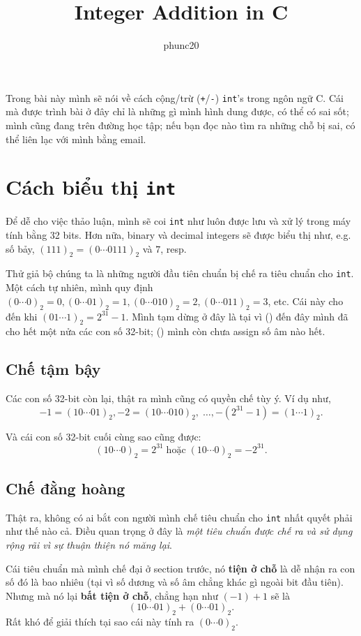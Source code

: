 \documentclass{article}
\author{phunc20}
\title{Integer Addition in C}
\begin{document}
\maketitle
Trong bài này mình sẽ nói về cách cộng/trừ (\texttt{+}/\texttt{-}) \texttt{int}'s trong ngôn ngữ C. Cái mà được trình bài ở đây chỉ là những gì mình hình dung được, có thể có sai sốt; mình cũng đang trên đường học tập; nếu bạn đọc nào tìm ra những chỗ bị sai, có thể liên lạc với mình bằng email.

\section{Cách biểu thị \texttt{int}}
Để dễ cho việc thảo luận, mình sẽ coi \texttt{int} như luôn được lưu và xử lý trong máy tính bằng 32 bits. Hơn nữa, binary và decimal integers sẽ được biểu thị như, e.g. số bảy, $(111)_{2} = (0\cdots0111)_{2}$ và $7$, resp.

Thử giả bộ chúng ta là những người đầu tiên chuẩn bị chế ra tiêu chuẩn cho \texttt{int}.
Một cách tự nhiên, mình quy định $(0\cdots0)_{2} = 0, (0\cdots01)_{2} = 1, (0\cdots010)_{2} = 2, (0\cdots011)_{2} = 3$, etc. Cái này cho đến khi $(01\cdots1)_{2} = 2^{31} - 1$. Mình tạm dừng ở đây là tại vì () đến đây mình đã cho hết một nửa các con số 32-bit; () mình còn chưa assign số âm nào hết.
\subsection{Chế tậm bậy}
Các con số 32-bit còn lại, thật ra mình cũng có quyền chế tùy ý. Ví dụ như, 
$$-1 = (10\cdots01)_{2}, -2 = (10\cdots010)_{2},\;\ldots, -(2^{31} - 1) = (1\cdots1)_{2}.$$

Và cái con số 32-bit cuối cùng sao cũng được:
$$(10\cdots0)_{2} = 2^{31} \;\textrm{hoặc}\; (10\cdots0)_{2} = -2^{31}.$$
\vfil \break

\subsection{Chế đằng hoàng}
Thật ra, không có ai bắt con người mình chế tiêu chuẩn cho \texttt{int} nhất quyết phải như thế nào cả. Điều quan trọng ở đây là \textit{một tiêu chuẩn được chế ra và sử dụng rộng rãi vì sự thuận thiện nó măng lại}.

Cái tiêu chuẩn mà mình chế đại ở section trước, nó \textbf{tiện ở chỗ} là dễ nhận ra con số đó là bao nhiêu (tại vì số dương và số âm chẳng khác gì ngoài bit đầu tiên). Nhưng mà nó lại \textbf{bất tiện ở chỗ}, chẳng hạn như $(-1) + 1$ sẽ là
$$(10\cdots01)_{2} + (0\cdots01)_{2}.$$
Rất khó để giải thích tại sao cái này tính ra $(0\cdots0)_{2}$.
\end{document}
